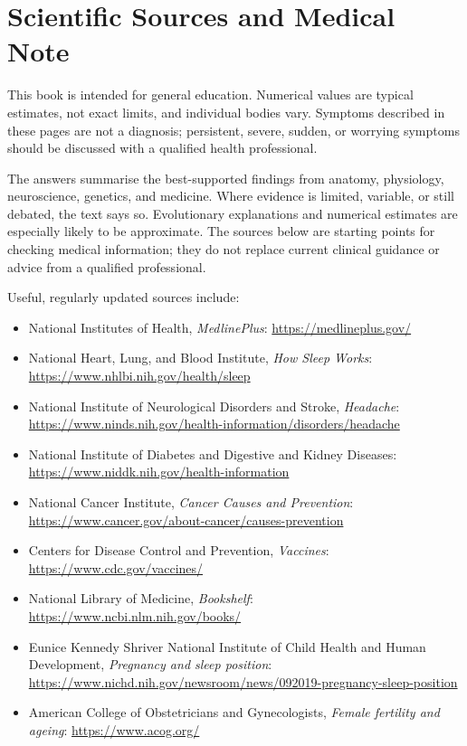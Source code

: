 \documentclass[11pt,oneside]{report}
\begin{document}
\chapter*{Scientific Sources and Medical Note}
{}

This book is intended for general education. Numerical values are typical
estimates, not exact limits, and individual bodies vary. Symptoms described in
these pages are not a diagnosis; persistent, severe, sudden, or worrying
symptoms should be discussed with a qualified health professional.

The answers summarise the best-supported findings from anatomy, physiology,
neuroscience, genetics, and medicine. Where evidence is limited, variable, or
still debated, the text says so. Evolutionary explanations and numerical
estimates are especially likely to be approximate. The sources below are
starting points for checking medical information; they do not replace current
clinical guidance or advice from a qualified professional.

Useful, regularly updated sources include:

\begin{itemize}
  \item National Institutes of Health, \emph{MedlinePlus}:\newline
  \url{https://medlineplus.gov/}
  \item National Heart, Lung, and Blood Institute, \emph{How Sleep Works}:\newline
  \url{https://www.nhlbi.nih.gov/health/sleep}
  \item National Institute of Neurological Disorders and Stroke, \emph{Headache}:\newline
  \url{https://www.ninds.nih.gov/health-information/disorders/headache}
  \item National Institute of Diabetes and Digestive and Kidney Diseases:\newline
  \url{https://www.niddk.nih.gov/health-information}
  \item National Cancer Institute, \emph{Cancer Causes and Prevention}:\newline
  \url{https://www.cancer.gov/about-cancer/causes-prevention}
  \item Centers for Disease Control and Prevention, \emph{Vaccines}:\newline
  \url{https://www.cdc.gov/vaccines/}
  \item National Library of Medicine, \emph{Bookshelf}:\newline
  \url{https://www.ncbi.nlm.nih.gov/books/}
  \item Eunice Kennedy Shriver National Institute of Child Health and Human
  Development, \emph{Pregnancy and sleep position}:\newline
  \url{https://www.nichd.nih.gov/newsroom/news/092019-pregnancy-sleep-position}
  \item American College of Obstetricians and Gynecologists, \emph{Female fertility and ageing}:\newline
  \url{https://www.acog.org/}
\end{itemize}

\clearpage
{}
{}
\printindex
\end{document}
